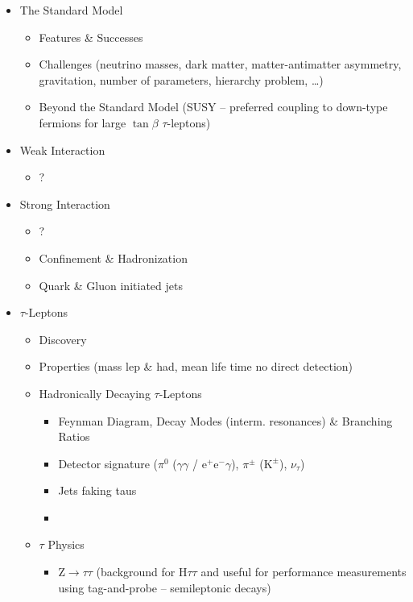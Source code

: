 \begin{itemize}
\item The Standard Model
  \begin{itemize}
  \item Features \& Successes

  \item Challenges (neutrino masses, dark matter, matter-antimatter asymmetry,
    gravitation, number of parameters, hierarchy problem, \ldots)

  \item Beyond the Standard Model (SUSY -- preferred coupling to down-type
    fermions for large $\tan\beta$ \textrightarrow $\tau$-leptons)
  \end{itemize}

\item Weak Interaction
\begin{itemize}
\item ?
\end{itemize}

\item Strong Interaction
\begin{itemize}
\item ?
\item Confinement \& Hadronization
\item Quark \& Gluon initiated jets
\end{itemize}

\item $\tau$-Leptons
\begin{itemize}
\item Discovery

\item Properties (mass \textrightarrow lep \& had, mean life time
  \textrightarrow no direct detection)

\item Hadronically Decaying $\tau$-Leptons
  \begin{itemize}
  \item Feynman Diagram, Decay Modes (interm. resonances) \& Branching Ratios
  \item Detector signature ($\pi^0$ ($\gamma \gamma$ / $\mathrm{e}^+
    \mathrm{e}^- \gamma$), $\pi^\pm$ ($\mathrm{K}^\pm$), $\nu_\tau$)
  \item Jets faking taus
  \item
  \end{itemize}

\item $\tau$ Physics
  \begin{itemize}
  \item $\mathrm{Z} \rightarrow \tau \tau$ (background for H$\tau \tau$ and
    useful for performance measurements using tag-and-probe -- semileptonic
    decays)


\end{itemize}
\end{itemize}
\end{itemize}
